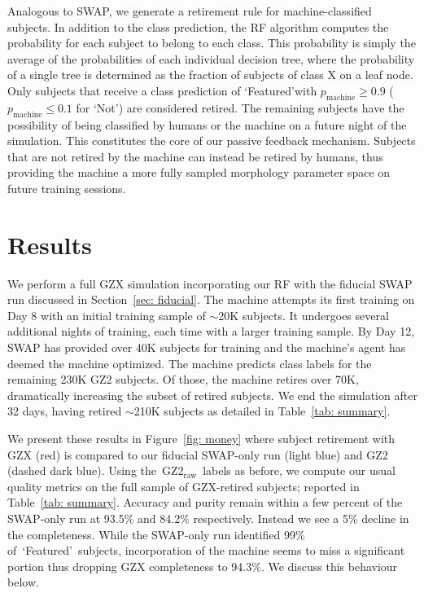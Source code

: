\documentclass[twocolumn,  trackchanges,]{aastex6}%
\newcommand{\feat}{`Featured'}
\newcommand{\notfeat}{`Not'}
\newcommand{\raw}{GZ2$_{\text{raw}}$}
\begin{document}
Analogous to SWAP, we generate a retirement rule for machine-classified subjects. 
In addition to the class prediction, the RF algorithm computes the probability for
each subject to belong to each class.  This probability is simply the average of
 the probabilities of each individual decision tree, where the probability of a 
single tree is determined as the fraction of subjects of class X on a leaf node.  
Only subjects that receive a class prediction of \feat with 
$p_{\mathrm{machine}} \ge 0.9$ ($p_{\mathrm{machine}} \le 0.1$ for \notfeat)
are considered retired. 
The remaining subjects have the possibility of being classified by humans 
or the machine on a future night of the simulation. 
This constitutes the core of our passive feedback mechanism. Subjects that are
not retired by the machine can instead be retired by humans, thus providing 
the machine a more fully sampled morphology parameter space on future 
training sessions. 




\section{Results} \label{sec: results}
We perform a full GZX simulation incorporating our RF with the fiducial 
SWAP run discussed in Section~\ref{sec: fiducial}. 
The machine attempts its first training on Day 8 with an initial training
sample of $\sim$20K subjects. It undergoes several additional nights 
of training, each time with a larger training sample. 
By Day 12, SWAP has provided over 40K subjects for training and the machine's 
agent has deemed the machine optimized. 
The machine predicts class labels for the remaining 230K GZ2 subjects. 
Of those, the machine retires over 70K, dramatically increasing the 
subset of retired subjects. 
We end the simulation after 32 days, having retired $\sim$210K subjects
as detailed in Table~\ref{tab: summary}. 

We present these results in Figure~\ref{fig: money} where subject retirement 
with GZX (red) is compared to our fiducial SWAP-only run (light blue) and GZ2 (dashed dark blue). 
Using the~\raw~labels as before, we compute our usual quality metrics on the 
full sample of GZX-retired subjects; reported in Table~\ref{tab: summary}. 
Accuracy and purity remain within a few percent of the SWAP-only run at 93.5\% 
and 84.2\% respectively. Instead we see a 5\% decline in the completeness. 
While the SWAP-only run identified 99\% of~\feat~subjects, incorporation
of the machine seems to miss a significant portion thus dropping GZX completeness to 94.3\%. 
We discuss this behaviour below.
\end{document}
